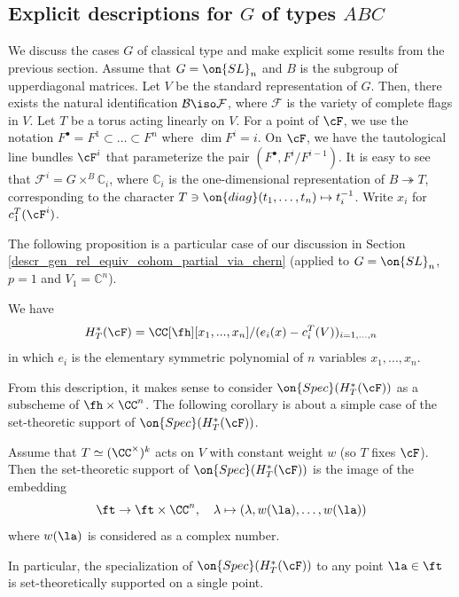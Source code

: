 \documentclass[12pt]{amsart}
\begin{document}
 
\subsection{Explicit descriptions for  $G$ of types $ABC$} %

We discuss the cases $G$ of classical type and make explicit some results from the previous section. Assume that $G=\on{SL}_n$ and $B$ is the subgroup of upperdiagonal matrices. Let $V$ be the standard representation of $G$. Then, there exists the natural identification $\mathcal{B} \iso \mathcal{F}$, where $\mathcal{F}$ is the variety of complete flags in $V$.  Let $T$ be a torus acting linearly on $V$. For a point of $\cF$, we use the notation $F^{\bullet}= F^{1}\subset\ldots\subset F^{n}$ where $\dim F^i= i$. On $\cF$, we have the tautological line bundles $\cF^{i}$ that parameterize the pair $(F^\bullet, F^i/F^{i-1})$. It is easy to see that $\mathcal{F}^i = G \times^B \mathbb{C}_{i}$, where $\mathbb{C}_{i}$ is the one-dimensional representation of $B \twoheadrightarrow T$, corresponding to the character $T \ni \on{diag}(t_1,\ldots,t_n) \mapsto t_i^{-1}$. Write $x_i$ for $c_1^{T}(\cF^i)$. %




The following proposition is a particular case of our discussion in Section \ref{descr_gen_rel_equiv_cohom_partial_via_chern} (applied to $G=\on{SL}_n$, $p=1$ and $V_1=\mathbb{C}^n$).
\begin{prop}\cite[Proposition 4.4.1]{Anderson2023EquivariantCI}
    We have 
    $$H^{*}_{T}(\cF)= \CC[\fh][x_1,...,x_n]/(e_i(x)- c^T_{i}(V))_{i=1,...,n}$$
    in which $e_i$ is the elementary symmetric polynomial of $n$ variables $x_1,...,x_n$. 
\end{prop}
From this description, it makes sense to consider $\on{Spec}(H^{*}_{T}(\cF))$ as a subscheme of $\fh
\\\times \CC^{n}$. The following corollary is about a simple case of the set-theoretic support of $\on{Spec}(H^{*}_{T}(\cF))$.
\begin{cor} \label{single point support}
    Assume that $T\simeq (\CC^\times)^k$ acts on $V$ with constant weight $w$ (so $T$ fixes $\cF$). Then the set-theoretic support of $\on{Spec}(H^{*}_{T}(\cF))$ is the image of the embedding
    $$\ft\rightarrow \ft\times \CC^n, \quad \lambda\mapsto (\lambda, w(\la),\ldots,w(\la))$$
    where $w(\la)$ is considered as a complex number.

    In particular, the specialization of $\on{Spec}(H^{*}_{T}(\cF))$ to any point $\la \in \ft$ is set-theoretically supported on a single point. 
\end{cor}
\end{document}
